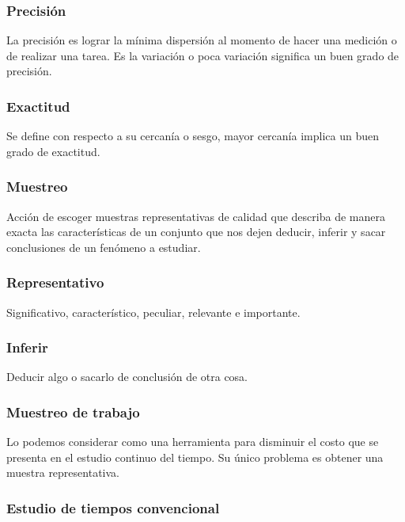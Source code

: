     \subsubsection{Precisión}
    
    La precisión es lograr la mínima dispersión al momento de hacer una medición o de realizar una tarea. Es la variación o poca variación significa un buen grado de precisión.
    
    \subsubsection{Exactitud}
    
    Se define con respecto a su cercanía o sesgo, mayor cercanía implica un buen grado de exactitud.
    
    \subsubsection{Muestreo}
    
    Acción de escoger muestras representativas de calidad que describa de manera exacta las características de un conjunto que nos dejen deducir, inferir y sacar conclusiones de un fenómeno a estudiar. \cite{RAE}
    
    \subsubsection{Representativo}
    
    Significativo, característico, peculiar, relevante e importante. \cite{RAE}
    
    \subsubsection{Inferir}
    
    Deducir algo o sacarlo de conclusión de otra cosa.\cite{RAE}
    
    \subsubsection{Muestreo de trabajo}
    
    Lo podemos considerar como una herramienta para disminuir el costo que se presenta  en el estudio continuo del tiempo. Su único problema es obtener una muestra representativa.
    
    \subsubsection{Estudio de tiempos convencional}
    
